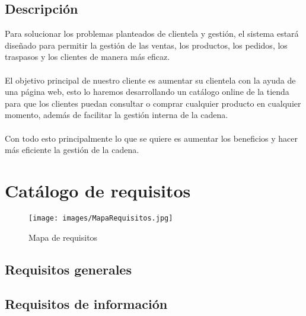 \subsection{Descripción}
Para solucionar los problemas planteados de clientela y gestión, el sistema estará diseñado para permitir la gestión de las ventas, los productos, los pedidos, los traspasos y los clientes de manera más eficaz.
\\\\
El objetivo principal de nuestro cliente es aumentar su clientela con la ayuda de una página web, esto lo haremos desarrollando un catálogo online de la tienda para que los clientes puedan consultar o comprar cualquier producto en cualquier momento, además de facilitar la gestión interna de la cadena.
\\\\
Con todo esto principalmente lo que se quiere es aumentar los beneficios y hacer más eficiente la gestión de la cadena.

\section{Catálogo de requisitos}

\begin{figure}[H]
	\texttt{[image: images/MapaRequisitos.jpg]}
	\caption{Mapa de requisitos}
\end{figure}

\subsection{Requisitos generales}


\subsection{Requisitos de información}


